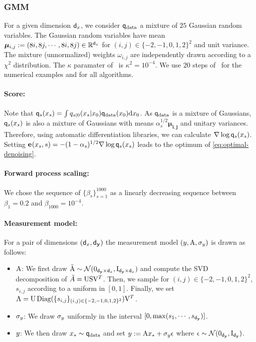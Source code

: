 \subsubsection{GMM}
For a given dimension ${\mathsf{d}_x}$, we consider $\fwmarg{\mathrm{data}}{}$ a mixture of $25$ Gaussian random variables.
The Gaussian random variables have mean $\boldsymbol{\mu}_{i, j} := (8i, 8j, \cdots, 8i, 8j) \in \mathbb{R}^{\mathsf{d}_x}$ for $(i, j) \in \{-2, -1, 0, 1, 2\}^2$ and unit variance.
The mixture (unnormalized) weights $\omega_{i, j}$ are independently drawn according to a $\chi^2$ distribution.
The $\kappa$ paramater of \algo\ is $\kappa^2 = 10^{-4}$.
We use $20$ steps of \ddim\ for the numerical examples and for all algorithms.
\paragraph{Score:}
Note that $\fwmarg{s}{\lstate_s} = \int \fwtrans{s|0}{\lstate_0}{\lstate_s}\fwmarg{\mathrm{data}}{\lstate_0} \rmd \lstate_0$. As $\fwmarg{\mathrm{data}}{}$ is a mixture of Gaussians, $\fwmarg{s}{\lstate_s}$ is also a mixture of Gaussians with means $\alpha_s^{1/2} \boldsymbol{\mu_{i, j}}$ and unitary variances.
Therefore, using automatic differentiation libraries, we can calculate $\nabla \log \fwmarg{s}{\lstate_s}$.
Setting $\epsprop{\lstate_s, s}{} = -(1 - \alpha_s)^{1/2} \nabla \log \fwmarg{s}{\lstate_s}$ leads to the optimum of \eqref{eq:optimal-denoising}.
\paragraph{Forward process scaling:}
We chose the sequence of $\{\beta_s\}_{s=1}^{1000}$ as a linearly decreasing sequence between $\beta_1=0.2$ and $\beta_{1000} = 10^{-4}$.
\paragraph{Measurement model:}
For a pair of dimensions $({\mathsf{d}_x}, {\mathsf{d}_{\mathbf{y}}})$ the measurement model $(y, \mathrm{A}, \sigma_y)$ is drawn as follows:
\begin{itemize}
    \item $\mathrm{A}$: We first draw $\tilde{\mathrm{A}} \sim \mathcal{N}(\mathrm{0}_{{\mathsf{d}_{\mathbf{y}}} \times {\mathsf{d}_x}}, \operatorname{I}_{{\mathsf{d}_{\mathbf{y}}} \times {\mathsf{d}_x}})$ and compute the SVD decomposition of $\tilde{A} = \mathrm{U} \mathrm{S} \mathrm{V}^T$. Then, we sample for $(i, j) \in \{-2, -1, 0, 1, 2\}^2$, $s_{i,j}$ according to a uniform in $[0, 1]$. Finally, we set $\mathrm{A} = \mathrm{U} \operatorname{Diag}(\{s_{i,j}\}_{(i, j) \in \{-2, -1, 0, 1, 2\}^2}) \mathrm{V}^T$.
    \item $\sigma_y$: We draw $\sigma_y$ uniformly in the interval $[0, \operatorname{max}(s_1, \cdots, s_{\mathsf{d}_{\mathbf{y}}})]$.
    \item $y$: We then draw $\lstate_{*} \sim \fwmarg{\mathrm{data}}{}$ and set $y := \mathrm{A} x_{*} + \sigma_y \epsilon$ where $\epsilon \sim \mathcal{N}(\mathrm{0}_{{\mathsf{d}_{\mathbf{y}}}}, \operatorname{I}_{{\mathsf{d}_{\mathbf{y}}}})$.
\end{itemize}
